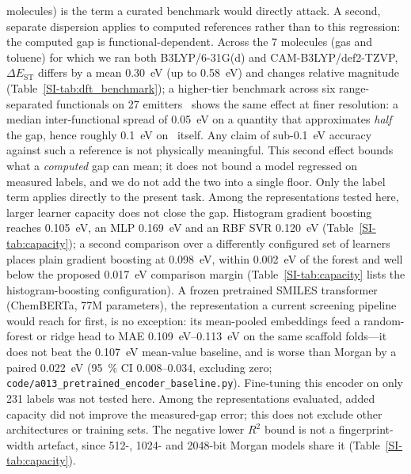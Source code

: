 molecules) is the term a curated benchmark would directly attack.
A second, separate dispersion applies to computed references rather than to this
regression: the computed gap is functional-dependent. Across the
\num{7} molecules (gas and toluene) for which we ran both B3LYP/6-31G(d) and CAM-B3LYP/def2-TZVP,
$\Delta E_\text{ST}$ differs by a mean \qty{0.30}{\electronvolt} (up to
\qty{0.58}{\electronvolt}) and changes
relative magnitude (Table~\ref{SI-tab:dft_benchmark}); a higher-tier benchmark across
six range-separated functionals on \num{27} emitters~\cite{Froitzheim2024} shows the same
effect at finer resolution: a median inter-functional spread of \qty{0.05}{\electronvolt}
on a quantity that approximates \emph{half} the gap, hence roughly
\qty{0.1}{\electronvolt} on \deltaest\ itself. Any claim of sub-\qty{0.1}{\electronvolt}
accuracy against such a reference is not physically meaningful. This second effect bounds
what a \emph{computed} gap can mean; it does not bound a model regressed on measured
labels, and we do not add the two into a single floor. Only the label term applies
directly to the present task. Among the representations tested here, larger
learner capacity does not close the gap. Histogram gradient boosting reaches
\qty{0.105}{\electronvolt}, an MLP \qty{0.169}{\electronvolt} and an RBF SVR
\qty{0.120}{\electronvolt} (Table~\ref{SI-tab:capacity}); a second comparison over a
differently configured set of learners places plain gradient boosting at
\qty{0.098}{\electronvolt}, within \qty{0.002}{\electronvolt} of the forest and well below the proposed
\qty{0.017}{\electronvolt} comparison margin
(Table~\ref{SI-tab:capacity} lists the
histogram-boosting configuration). A frozen pretrained SMILES transformer (ChemBERTa,
\num{77}M parameters), the representation a current screening pipeline would reach for
first, is no exception: its mean-pooled embeddings feed a random-forest or ridge head
to MAE \qtyrange{0.109}{0.113}{\electronvolt} on the same scaffold folds---it does not
beat the \qty{0.107}{\electronvolt} mean-value baseline, and is worse than Morgan by a
paired \qty{0.022}{\electronvolt} (\qty{95}{\percent} CI \numrange{0.008}{0.034},
excluding zero; \texttt{code/a013\_pretrained\_encoder\_baseline.py}). Fine-tuning this encoder on only \num{231} labels was not tested here.
Among the representations evaluated, added capacity did not improve the
measured-gap error; this does not exclude other architectures or training sets.
The negative lower $R^2$ bound is not a
fingerprint-width artefact, since \num{512}-, \num{1024}- and \num{2048}-bit Morgan models
share it (Table~\ref{SI-tab:capacity}).

